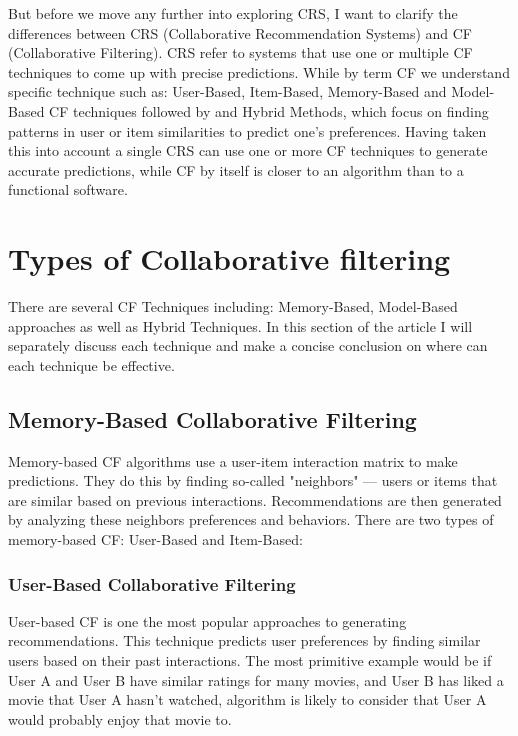 \documentclass[10pt,a4paper]{article}
\begin{document}
\hspace{0.1cm}

But before we move any further into exploring CRS, I want to clarify the differences between CRS (Collaborative Recommendation Systems) and CF (Collaborative Filtering). CRS refer to systems that use one or multiple CF techniques to come up with precise predictions. While by term CF we understand specific technique such as: User-Based, Item-Based, Memory-Based and Model-Based CF techniques followed by and Hybrid Methods, which focus on finding patterns in user or item similarities to predict one's preferences. Having taken this into account a single CRS can use one or more CF techniques to generate accurate predictions, while CF by itself is closer to an algorithm than to a functional software.


\section{Types of Collaborative filtering}
\label{sec:types_of_collaborative_filtering}
There are several CF Techniques including: Memory-Based, Model-Based approaches as well as Hybrid Techniques. In this section of the article I will separately discuss each technique and make a concise conclusion on where can each technique be effective.

\subsection{Memory-Based Collaborative Filtering}
Memory-based CF algorithms use a user-item interaction matrix to make predictions. They do this by finding so-called "neighbors" — users or items that are similar based on previous interactions. Recommendations are then generated by analyzing these neighbors preferences and behaviors. There are two types of memory-based CF: User-Based and Item-Based:
 
\subsubsection{User-Based Collaborative Filtering}
User-based CF is one the most popular approaches to generating recommendations. This technique predicts user preferences by finding similar users based on their past interactions. The most primitive example would be if User A and User B have similar ratings for many movies, and User B has liked a movie that User A hasn't watched, algorithm is likely to consider that User A would probably enjoy that movie to. \cite{8506344}
\end{document}
